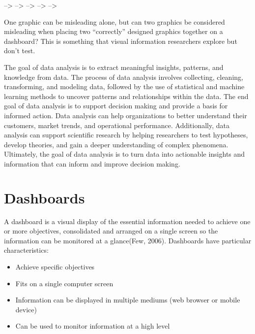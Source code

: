 \documentclass[print]{nuthesis}
\providecommand{\tightlist}{%
  \setlength{\itemsep}{0pt}\setlength{\parskip}{0pt}}
\begin{document}

--\textgreater{}
--\textgreater{}
--\textgreater{}
--\textgreater{}
--\textgreater{}

One graphic can be misleading alone, but can two graphics be considered misleading when placing two ``correctly'' designed graphics together on a dashboard?
This is something that visual information researchers explore but don't test.

The goal of data analysis is to extract meaningful insights, patterns, and knowledge from data.
The process of data analysis involves collecting, cleaning, transforming, and modeling data, followed by the use of statistical and machine learning methods to uncover patterns and relationships within the data.
The end goal of data analysis is to support decision making and provide a basis for informed action.
Data analysis can help organizations to better understand their customers, market trends, and operational performance.
Additionally, data analysis can support scientific research by helping researchers to test hypotheses, develop theories, and gain a deeper understanding of complex phenomena.
Ultimately, the goal of data analysis is to turn data into actionable insights and information that can inform and improve decision making.

\hypertarget{dashboards}{%
\section{Dashboards}\label{dashboards}}

A dashboard is a visual display of the essential information needed to achieve one or more objectives, consolidated and arranged on a single screen so the information can be monitored at a glance(Few, 2006).
Dashboards have particular characteristics:

\begin{itemize}
\tightlist
\item
  Achieve specific objectives
\item
  Fits on a single computer screen
\item
  Information can be displayed in multiple mediums (web browser or mobile device)
\item
  Can be used to monitor information at a high level
\end{itemize}
\end{document}
